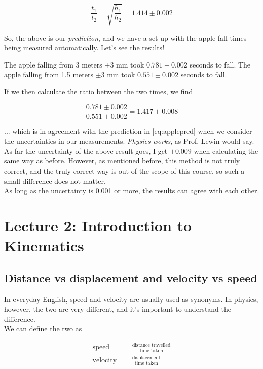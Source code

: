 \documentclass[12pt,a4paper]{report}
\begin{document}
\begin{equation}
 \frac{t_1}{t_2} = \sqrt{\frac{h_1}{h_2}} = 1.414 \pm 0.002 \label{eq:applepred}
\end{equation}

So, the above is our \emph{prediction}, and we have a set-up with the apple fall times being measured automatically. Let's see the results!

The apple falling from 3 meters $\pm 3$ mm took $0.781 \pm 0.002$ seconds to fall. The apple falling from 1.5 meters $\pm 3$ mm took $0.551 \pm 0.002$ seconds to fall.

If we then calculate the ratio between the two times, we find

\begin{equation}
\frac{0.781 \pm 0.002}{0.551 \pm 0.002} = 1.417 \pm 0.008
\end{equation}

... which is in agreement with the prediction in \eqref{eq:applepred} when we consider the uncertainties in our measurements. \emph{Physics works}, as Prof. Lewin would say.\\
As far the uncertainty of the above result goes, I get $\pm 0.009$ when calculating the same way as before. However, as mentioned before, this method is not truly correct, and the truly correct way is out of the scope of this course, so such a small difference does not matter.\\
As long as the uncertainty is 0.001 or more, the results can agree with each other.

\section{Lecture 2: Introduction to Kinematics}

\subsection{Distance vs displacement and velocity vs speed}

In everyday English, speed and velocity are usually used as synonyms. In physics, however, the two are very different, and it's important to understand the difference.\\
We can define the two as

\begin{align}
 \text{speed} &= \frac{\text{distance travelled}}{\text{time taken}}\\
 \text{velocity} &= \frac{\text{displacement}}{\text{time taken}}
\end{align}
\end{document}
